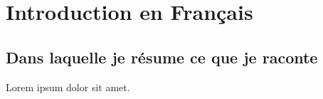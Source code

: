 \setchapterpreamble[u]{\margintoc}
\chapter{Introduction en Français}

\section{Dans laquelle je résume ce que je raconte}

Lorem ipsum dolor sit amet.
